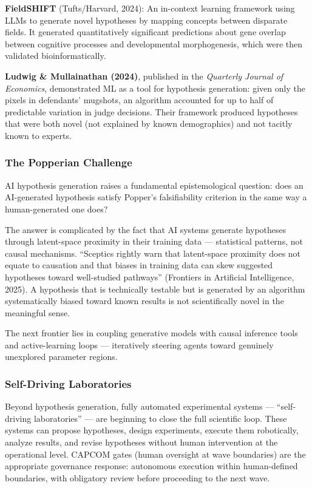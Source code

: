 \documentclass[11pt,letterpaper]{article}
\begin{document}
\textbf{FieldSHIFT} (Tufts/Harvard, 2024): An in-context learning framework using LLMs to generate novel hypotheses by mapping concepts between disparate fields. It generated quantitatively significant predictions about gene overlap between cognitive processes and developmental morphogenesis, which were then validated bioinformatically.

\textbf{Ludwig \& Mullainathan (2024)}, published in the \emph{Quarterly Journal of Economics}, demonstrated ML as a tool for hypothesis generation: given only the pixels in defendants' mugshots, an algorithm accounted for up to half of predictable variation in judge decisions. Their framework produced hypotheses that were both novel (not explained by known demographics) and not tacitly known to experts.

\subsubsection{The Popperian Challenge}

AI hypothesis generation raises a fundamental epistemological question: does an AI-generated hypothesis satisfy Popper's falsifiability criterion in the same way a human-generated one does?

The answer is complicated by the fact that AI systems generate hypotheses through latent-space proximity in their training data --- statistical patterns, not causal mechanisms. ``Sceptics rightly warn that latent-space proximity does not equate to causation and that biases in training data can skew suggested hypotheses toward well-studied pathways'' (Frontiers in Artificial Intelligence, 2025). A hypothesis that is technically testable but is generated by an algorithm systematically biased toward known results is not scientifically novel in the meaningful sense.

The next frontier lies in coupling generative models with causal inference tools and active-learning loops --- iteratively steering agents toward genuinely unexplored parameter regions.

\subsubsection{Self-Driving Laboratories}

Beyond hypothesis generation, fully automated experimental systems --- ``self-driving laboratories'' --- are beginning to close the full scientific loop. These systems can propose hypotheses, design experiments, execute them robotically, analyze results, and revise hypotheses without human intervention at the operational level. CAPCOM gates (human oversight at wave boundaries) are the appropriate governance response: autonomous execution within human-defined boundaries, with obligatory review before proceeding to the next wave.
\end{document}
